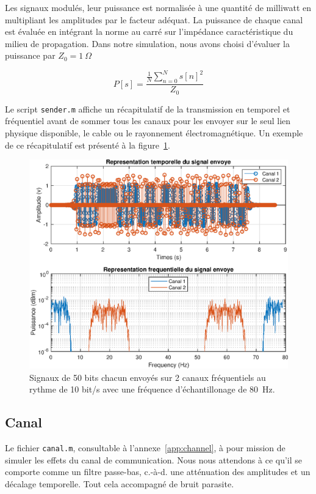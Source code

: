 \documentclass[10pt, oneside, a4paper]{article}
\begin{document}
Les signaux modulés, leur puissance est normalisée à une quantité de milliwatt en multipliant les amplitudes par le facteur adéquat.
La puissance de chaque canal est évaluée en intégrant la norme au carré sur l'impédance caractéristique du milieu de propagation.
Dans notre simulation, nous avons choisi d'évaluer la puissance par $Z_0 = \SI{1}{\Omega}$

\begin{equation}
    P[s] = \frac{\frac{1}{N} \sum_{n = 0}^{N} s[n]^2}{Z_0}
\end{equation}

Le script \texttt{sender.m} affiche un récapitulatif de la transmission en temporel et fréquentiel avant de sommer tous les canaux pour les envoyer sur le seul lien physique disponible, le cable ou le rayonnement électromagnétique.
Un exemple de ce récapitulatif est présenté à la figure~\ref{fig:sender}.

\begin{figure}[p]
    \centering
    \includegraphics[height=0.45\textheight]{eps/sender.eps}
    \caption{Signaux de 50 bits chacun envoyés sur 2 canaux fréquentiels au rythme de 10 bit/s
             avec une fréquence d'échantillonage de \SI{80}{\hertz}.}
    \label{fig:sender}
\end{figure}

\subsection{Canal}
Le fichier \texttt{canal.m}, consultable à l'annexe~\ref{app:channel}, à pour mission de simuler les effets du canal de communication.
Nous nous attendons à ce qu'il se comporte comme un filtre passe-bas, c.-à-d. une atténuation des amplitudes et un décalage temporelle.
Tout cela accompagné de bruit parasite.
\end{document}
